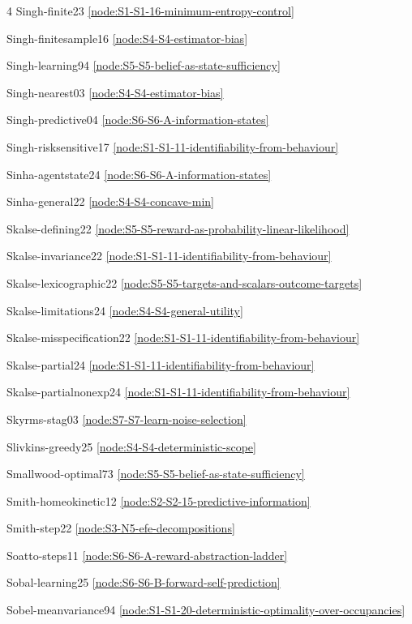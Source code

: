 \documentclass[10pt]{article}
\begin{document}
{\begin{multicols}{4}
Singh-finite23 \hfill \ref{node:S1-S1-16-minimum-entropy-control}\par
Singh-finitesample16 \hfill \ref{node:S4-S4-estimator-bias}\par
Singh-learning94 \hfill \ref{node:S5-S5-belief-as-state-sufficiency}\par
Singh-nearest03 \hfill \ref{node:S4-S4-estimator-bias}\par
Singh-predictive04 \hfill \ref{node:S6-S6-A-information-states}\par
Singh-risksensitive17 \hfill \ref{node:S1-S1-11-identifiability-from-behaviour}\par
Sinha-agentstate24 \hfill \ref{node:S6-S6-A-information-states}\par
Sinha-general22 \hfill \ref{node:S4-S4-concave-min}\par
Skalse-defining22 \hfill \ref{node:S5-S5-reward-as-probability-linear-likelihood}\par
Skalse-invariance22 \hfill \ref{node:S1-S1-11-identifiability-from-behaviour}\par
Skalse-lexicographic22 \hfill \ref{node:S5-S5-targets-and-scalars-outcome-targets}\par
Skalse-limitations24 \hfill \ref{node:S4-S4-general-utility}\par
Skalse-misspecification22 \hfill \ref{node:S1-S1-11-identifiability-from-behaviour}\par
Skalse-partial24 \hfill \ref{node:S1-S1-11-identifiability-from-behaviour}\par
Skalse-partialnonexp24 \hfill \ref{node:S1-S1-11-identifiability-from-behaviour}\par
Skyrms-stag03 \hfill \ref{node:S7-S7-learn-noise-selection}\par
Slivkins-greedy25 \hfill \ref{node:S4-S4-deterministic-scope}\par
Smallwood-optimal73 \hfill \ref{node:S5-S5-belief-as-state-sufficiency}\par
Smith-homeokinetic12 \hfill \ref{node:S2-S2-15-predictive-information}\par
Smith-step22 \hfill \ref{node:S3-N5-efe-decompositions}\par
Soatto-steps11 \hfill \ref{node:S6-S6-A-reward-abstraction-ladder}\par
Sobal-learning25 \hfill \ref{node:S6-S6-B-forward-self-prediction}\par
Sobel-meanvariance94 \hfill \ref{node:S1-S1-20-deterministic-optimality-over-occupancies}\par

\end{multicols}}
\end{document}
